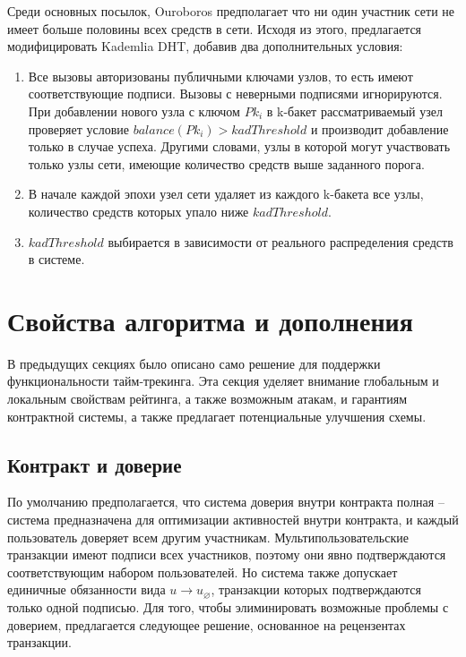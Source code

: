 \documentclass[specification,annotation]{itmo-student-thesis}
\begin{document}
Среди основных посылок, Ouroboros предполагает что ни один участник
сети не имеет больше половины всех средств в сети. Исходя из этого,
предлагается модифицировать Kademlia DHT, добавив два дополнительных условия:
\begin{enumerate}
\item Все вызовы авторизованы публичными ключами узлов, то есть имеют
  соответствующие подписи. Вызовы с неверными подписями
  игнорируются. При добавлении нового узла с ключом $Pk_i$ в k-бакет
  рассматриваемый узел проверяет условие $balance(Pk_i) >
  kadThreshold$ и производит добавление только в случае
  успеха. Другими словами, узлы в которой могут участвовать только
  узлы сети, имеющие количество средств выше заданного порога.
\item В начале каждой эпохи узел сети удаляет из каждого k-бакета все
  узлы, количество средств которых упало ниже $kadThreshold$.
\item $kadThreshold$ выбирается в зависимости от реального
  распределения средств в системе.
\end{enumerate}

\section{Свойства алгоритма и дополнения}
\label{sec:additions}

В предыдущих секциях было описано само решение для поддержки
функциональности тайм-трекинга. Эта секция уделяет внимание глобальным
и локальным свойствам рейтинга, а также возможным атакам, и гарантиям
контрактной системы, а также предлагает потенциальные улучшения схемы.

\subsection{Контракт и доверие}

По умолчанию предполагается, что система доверия внутри контракта
полная -- система предназначена для оптимизации активностей внутри
контракта, и каждый пользователь доверяет всем другим
участникам. Мультипользовательские транзакции имеют подписи всех
участников, поэтому они явно подтверждаются соответствующим набором
пользователей. Но система также допускает единичные обязанности вида
$u \rightarrow u_{\varnothing}$, транзакции которых подтверждаются
только одной подписью. Для того, чтобы элиминировать возможные
проблемы с доверием, предлагается следующее решение, основанное на
рецензентах транзакции.
\end{document}
